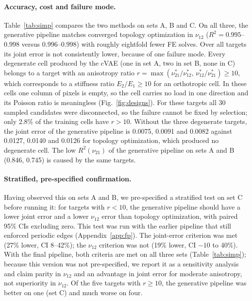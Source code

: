 \documentclass[a4paper,11pt]{article}
\newcommand{\nuot}{\nu_{12}}
\newcommand{\nuto}{\nu_{21}}
\newcommand{\RR}{R^2}
\begin{document}
\paragraph{Accuracy, cost and failure mode.}
Table~\ref{tab:simp} compares the two methods on sets A, B and C. On all
three, the generative pipeline matches converged topology optimization in
$\nuot$ ($\RR=0.995$--$0.998$ versus $0.996$--$0.998$) with roughly eightfold
fewer FE solves. Over all targets its joint error is not consistently lower,
because of one failure mode. Every degenerate cell produced by the cVAE (one
in set A, two in set B, none in C) belongs to a target with an anisotropy
ratio $r=\max(\nuto^{*}/\nuot^{*},\,\nuot^{*}/\nuto^{*})\ge10$, which
corresponds to a stiffness ratio $E_2/E_1\ge10$ for an orthotropic cell. In
these cells one column of pixels is empty, so the cell carries no load in one
direction and its Poisson ratio is meaningless (Fig.~\ref{fig:designs}).
For these targets all 30 sampled candidates were disconnected, so the
failure cannot be fixed by selection; only 2.8\% of the training cells have
$r>10$. Without the three degenerate targets, the joint error of the
generative pipeline is 0.0075, 0.0091 and 0.0082 against 0.0127, 0.0140 and
0.0126 for topology optimization, which produced no degenerate cell. The
low $\RR(\nuto)$ of the generative pipeline on sets A and B (0.846, 0.745)
is caused by the same targets.

\paragraph{Stratified, pre-specified confirmation.}
Having observed this on sets A and B, we pre-specified a stratified test on
set C before running it: for targets with $r<10$, the generative pipeline
should have a lower joint error and a lower $\nuot$ error than topology
optimization, with paired 95\% CIs excluding zero. This test was run with the
earlier pipeline that still enforced periodic edges (Appendix~\ref{app:fp}).
The joint-error criterion was met (27\% lower, CI 8--42\%); the $\nuot$
criterion was not (19\% lower, CI $-10$ to 40\%). With the final pipeline,
both criteria are met on all three sets (Table~\ref{tab:simp}); because this
version was not pre-specified, we report it as a sensitivity analysis and
claim parity in $\nuot$ and an advantage in joint error for moderate
anisotropy, not superiority in $\nuot$. Of the five targets with $r\ge10$,
the generative pipeline was better on one (set C) and much worse on four.
\end{document}
